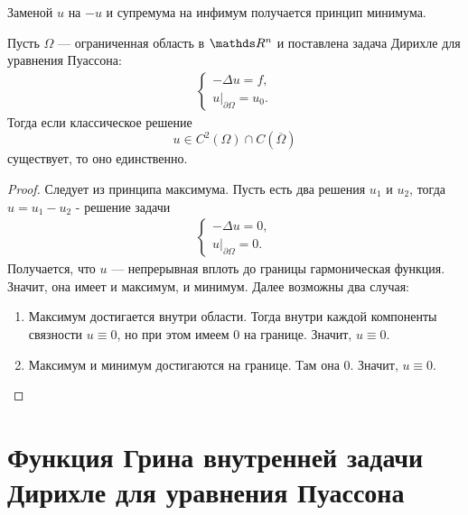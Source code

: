 \begin{note} Заменой $u$ на $-u$ и супремума на инфимум получается принцип минимума.
\end{note}

\begin{corollary} Пусть $\Omega$ --- ограниченная область в $\real^n$ и поставлена задача Дирихле для уравнения Пуассона:
\begin{align*}
	\begin{cases*}
		- \Delta u = f,\\
		u\Big\rvert_{\partial \Omega} = u_0.
	\end{cases*}
\end{align*}
Тогда если классическое решение
$$ u \in C^2(\Omega) \cap C(\overline{\Omega})$$
существует, то оно единственно.
\end{corollary}
\begin{proof}
Следует из принципа максимума. Пусть есть два решения $u_1$ и $u_2$, тогда $u = u_1 - u_2$ - решение задачи
\begin{align*}
	\begin{cases*}
		- \Delta u = 0,\\
		u\Big\rvert_{\partial \Omega} = 0.
	\end{cases*}
\end{align*}
Получается, что $u$ --- непрерывная вплоть до границы гармоническая функция. Значит, она имеет и максимум, и минимум. Далее возможны два случая:
\begin{enumerate}
\item Максимум достигается внутри области. Тогда внутри каждой компоненты связности $u \equiv 0$, но при этом имеем $0$ на границе. Значит, $u \equiv 0$.
\item Максимум и минимум достигаются на границе. Там она $0$. Значит, $u \equiv 0$.
\end{enumerate}
\end{proof}

\section{Функция Грина внутренней задачи Дирихле для уравнения Пуассона}
